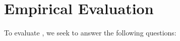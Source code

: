 \section{Empirical Evaluation}



To evaluate {\tool}, we seek to answer the following questions:




